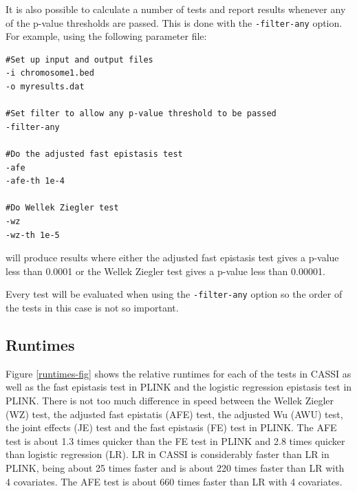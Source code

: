 \documentclass[a4paper,12pt]{article}
\newcommand{\code}[1]{{\footnotesize{{\tt #1}}}}
\begin{document}
It is also possible to calculate a number of tests and report results whenever any of the p-value thresholds are passed. This is done with the \code{-filter-any} option. For example, using the following parameter file: 
\vspace{0.35cm} \begin{lstlisting}
#Set up input and output files
-i chromosome1.bed
-o myresults.dat

#Set filter to allow any p-value threshold to be passed
-filter-any

#Do the adjusted fast epistasis test
-afe
-afe-th 1e-4

#Do Wellek Ziegler test
-wz
-wz-th 1e-5

\end{lstlisting} \vspace{0.35cm}
will produce results where either the adjusted fast epistasis test gives a p-value less than 0.0001 or the Wellek Ziegler test gives a p-value less than 0.00001. 

Every test will be evaluated when using the \code{-filter-any} option so the order of the tests in this case is not so important. 


\subsection{Runtimes}
\label{run-times}

Figure  \ref{runtimes-fig} shows the relative runtimes for each of the tests in CASSI as well as the fast epistasis test in PLINK and the logistic regression epistasis test in PLINK. There is not too much difference in speed between the Wellek Ziegler (WZ) test, the adjusted fast epistatis (AFE) test, the adjusted Wu (AWU) test, the joint effects (JE) test and the fast epistasis (FE) test in PLINK. The AFE test is about 1.3 times quicker than the FE test in PLINK and 2.8 times quicker than logistic regression (LR). LR in CASSI is considerably faster than LR in PLINK, being about 25 times faster and is about 220 times faster than LR with 4 covariates. The AFE test is about 660 times faster than LR with 4 covariates. 
\end{document}
